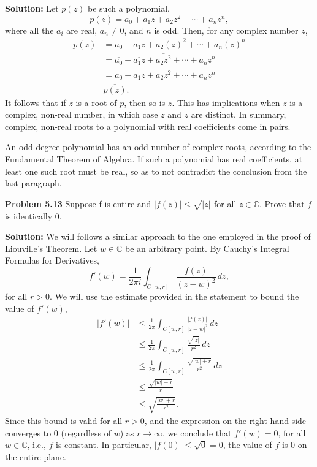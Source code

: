 \documentclass[12pt,oneside]{exam}
\newenvironment{exercise}[1]{\vspace{.1in}\noindent\textbf{Problem #1 \hspace{.05em}}}{}
\begin{document}
\vspace{0.5cm}
\noindent \textbf{Solution:} 
Let $p(z)$ be such a polynomial, 
\begin{equation*}
p(z) = a_0 + a_1z + a_2z^2 + \cdots + a_nz^n,
\end{equation*}
where all the $a_i$ are real, $a_n \neq 0$, and $n$ is odd. Then, for any complex number $z$, 
\begin{align*}
p(\overline{z}) & = a_0 + a_1\overline{z} + a_2(\overline{z})^2+\cdots + a_n(\overline{z})^n \\
& = \overline{a_0} + \overline{a_1z} + \overline{a_2z^2} + \cdots + \overline{a_nz^n} \\
& = \overline{a_0 + a_1z + a_2z^2 + \cdots + a_nz^n} \\
& \overline{p(z)}.
\end{align*}
It follows that if $z$ is a root of $p$, then so is $\overline{z}$. This has implications when $z$ is a complex, non-real number, in which case $z$ and $\overline{z}$ are distinct. In summary, complex, non-real roots to a polynomial with real coefficients come in pairs. 

An odd degree polynomial has an odd number of complex roots, according to the Fundamental Theorem of Algebra. If such a polynomial has real coefficients, at least one such root must be real, so as to not contradict the conclusion from the last paragraph. 
\vspace{1cm}

\begin{exercise}{5.13}
Suppose f is entire and $|f(z)| \leq \sqrt{|z|}$ for all $z \in \mathbb{C}$. Prove that $f$ is identically $0$. 
\end{exercise}

\vspace{0.5cm}

\noindent \textbf{Solution:} 
We will follows a similar approach to the one employed in the proof of Liouville's Theorem. Let $w \in \mathbb{C}$ be an arbitrary point. By Cauchy's Integral Formulas for Derivatives, 
\begin{equation*}
f'(w) = \frac{1}{2\pi i}\int_{C[w,r]} \frac{f(z)}{(z-w)^2} \, dz,
\end{equation*}
for all $r>0$. We will use the estimate provided in the statement to bound the value of $f'(w)$, 
\begin{align*}
|f'(w)| & \leq \frac{1}{2\pi}\int_{C[w,r]} \frac{|f(z)|}{|z-w|^2}\, dz \\
& \leq \frac{1}{2\pi} \int_{C[w,r]} \frac{\sqrt{|z|}}{r^2}\, dz \\
& \leq \frac{1}{2\pi} \int_{C[w,r]} \frac{\sqrt{|w|+r}}{r^2}\, dz\\
& \leq \frac{\sqrt{|w|+r}}{r}\\
& \leq \sqrt{\frac{|w|+r}{r^2}}.
\end{align*}
Since this bound is valid for all $r>0$, and the expression on the right-hand side converges to $0$ (regardless of $w$) as $r \to \infty$, we conclude that $f'(w)=0$, for all $w\in \mathbb{C}$, i.e., $f$ is constant. In particular, $|f(0)| \leq \sqrt{0} = 0$, the value of $f$ is $0$ on the entire plane.  
\end{document}
